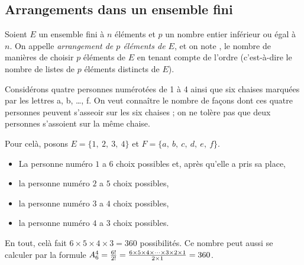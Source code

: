             \subsection{Arrangements dans un ensemble fini}
                  \begin{defi}
                        Soient $E$ un ensemble fini \`a $n$ \'el\'ements et $p$ un nombre entier inf\'erieur ou \'egal \`a $n$.
                        On appelle \emph{arrangement de $p$ \'el\'ements de $E$}, et on note 
                        , le nombre de mani\`eres de choisir $p$ \'el\'ements de $E$ en tenant compte de l'ordre
                        (c'est-\`a-dire le nombre de listes de $p$ \'el\'ements distincts de $E$).
                  \end{defi}
                  	\begin{prop}
                  			\propbox{
                 				\[
                  					\Arr{n}{p} = \frac{n!}{(n-p)!}
                  				\]}
                  	\end{prop}
						\begin{ex}
							Consid\'erons quatre personnes num\'erot\'ees de 1 \`a 4
							ainsi que six chaises marqu\'ees par les lettres a, b, \ldots, f.
							On veut conna\^itre le nombre de fa\c{c}ons dont ces quatre personnes
							peuvent s'asseoir sur les six chaises ;
							on ne tol\`ere pas que deux personnes s'assoient sur la m\^eme chaise.
							\begin{valiny}
								Pour cel\`a, posons	$E = \{ 1 ,\ 2,\ 3,\ 4 \}$ et 
															$F = \{ a,\ b,\ c,\ d,\ e,\ f \}$.
								\begin{itemize}
									\item La personne num\'ero $1$ a $6$ choix possibles et, apr\`es qu'elle a pris sa place,
									\item la personne num\'ero $2$ a $5$ choix possibles,
									\item la personne num\'ero $3$ a $4$ choix possibles,
									\item la personne num\'ero $4$ a $3$ choix possibles.
								\end{itemize}
								En tout, cel\`a fait $6\times 5 \times 4 \times 3 = 360$ possibilit\'es.
									Ce nombre peut aussi se calculer par la formule
								$A_{6}^{4} 
									= \frac{6!}{2!} 
									= \frac{6\times 5 \times 4 \times \cdots \times 3 \times 2 \times 1}{2 \times 1}
									= 360
								$.
							\end{valiny}
						\end{ex}
